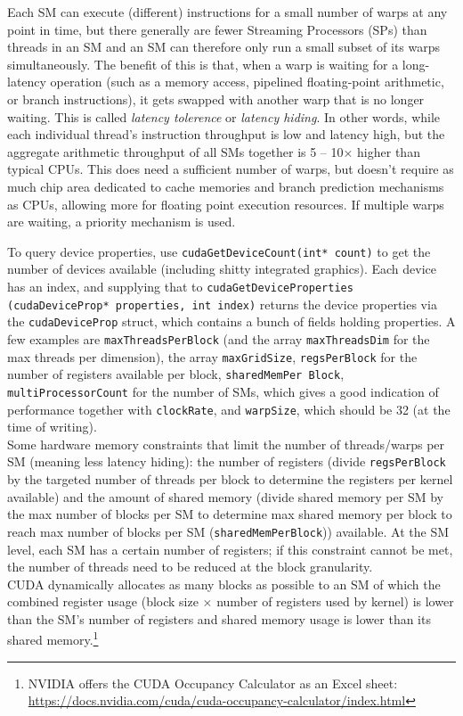 \documentclass[8pt, table, xcdraw]{article}%
\begin{document}
Each SM can execute (different) instructions for a small number of warps at any point in time, but there generally are fewer Streaming Processors (SPs) than threads in an SM and an SM can therefore only run a small subset of its warps simultaneously. The benefit of this is that, when a warp is waiting for a long-latency operation (such as a memory access, pipelined floating-point arithmetic, or branch instructions), it gets swapped with another warp that is no longer waiting. This is called \emph{latency tolerence} or \emph{latency hiding}. In other words, while each individual thread's instruction throughput is low and latency high, but the aggregate arithmetic throughput of all SMs together is 5 – 10× higher than typical CPUs. This does need a sufficient number of warps, but doesn't require as much chip area dedicated to cache memories and branch prediction mechanisms as CPUs, allowing more for floating point execution resources. If multiple warps are waiting, a priority mechanism is used.

To query device properties, use \lstinline{cudaGetDeviceCount(int* count)} to get the number of devices available (including shitty integrated graphics). Each device has an index, and supplying that to \lstinline{cudaGetDeviceProperties (cudaDeviceProp* properties, int index)} returns the device properties via the \lstinline{cudaDeviceProp} struct, which contains a bunch of fields holding properties. A few examples are \lstinline{maxThreadsPerBlock} (and the array \lstinline{maxThreadsDim} for the max threads per dimension), the array \lstinline{maxGridSize}, \lstinline{regsPerBlock} for the number of registers available per block, \lstinline{sharedMemPer Block}, \lstinline{multiProcessorCount} for the number of SMs, which gives a good indication of performance together with \lstinline{clockRate}, and \lstinline{warpSize}, which should be 32 (at the time of writing).\\
Some hardware memory constraints that limit the number of threads/warps per SM (meaning less latency hiding): the number of registers (divide \lstinline{regsPerBlock} by the targeted number of threads per block to determine the registers per kernel available) and the amount of shared memory (divide shared memory per SM by the max number of blocks per SM to determine max shared memory per block to reach max number of blocks per SM (\lstinline{sharedMemPerBlock})) available. At the SM level, each SM has a certain number of registers; if this constraint cannot be met, the number of threads need to be reduced at the block granularity.\\
CUDA dynamically allocates as many blocks as possible to an SM of which the combined register usage (block size $\times$ number of registers used by kernel) is lower than the SM's number of registers and shared memory usage is lower than its shared memory.\footnote{NVIDIA offers the CUDA Occupancy Calculator as an Excel sheet: \url{https://docs.nvidia.com/cuda/cuda-occupancy-calculator/index.html}}
\end{document}
